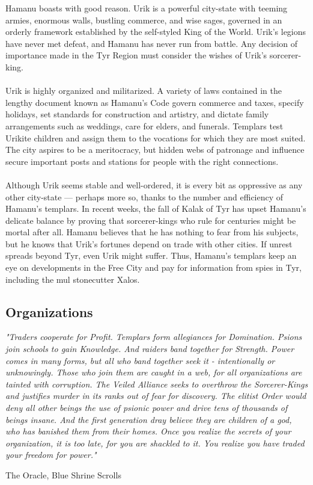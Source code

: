 \begin{multicols}{2}
Hamanu boasts with good reason. Urik is a powerful
city-state with teeming armies, enormous walls,
bustling commerce, and wise sages, governed in an
orderly framework established by the self-styled King
of the World. Urik's legions have never met defeat,
and Hamanu has never run from battle. Any decision
of importance made in the Tyr Region must consider
the wishes of Urik’s sorcerer-king.\\
\\
Urik is highly organized and militarized. A variety
of laws contained in the lengthy document known as
Hamanu's Code govern commerce and taxes, specify
holidays, set standards for construction and artistry,
and dictate family arrangements such as weddings,
care for elders, and funerals. Templars test Urikite
children and assign them to the vocations for which
they are most suited. The city aspires to be a meritocracy,
but hidden webs of patronage and influence
secure important posts and stations for people with
the right connections.\\
\\
Although Urik seems stable and well-ordered, it
is every bit as oppressive as any other city-state — perhaps
more so, thanks to the number and efficiency
of Hamanu's templars. In recent weeks, the fall of
Kalak of Tyr has upset Hamanu's delicate balance by
proving that sorcerer-kings who rule for centuries
might be mortal after all. Hamanu believes that he
has nothing to fear from his subjects, but he knows
that Urik's fortunes depend on trade with other cities.
If unrest spreads beyond Tyr, even Urik might suffer.
Thus, Hamanu’s templars keep an eye on developments
in the Free City and pay for information from
spies in Tyr, including the mul stonecutter Xalos.\\

\end{multicols}

\hrulefill

\subsection{Organizations}

\epigraph{\textit{
"Traders cooperate for Profit. Templars form allegiances for Domination. Psions join schools to gain Knowledge. And
raiders band together for Strength. Power comes in many forms, but all who band together seek it - intentionally or
unknowingly. Those who join them are caught in a web, for all organizations are tainted with corruption. The Veiled
Alliance seeks to overthrow the Sorcerer-Kings and justifies murder in its ranks out of fear for discovery. The elitist Order
would deny all other beings the use of psionic power and drive tens of thousands of beings insane. And the first generation
dray believe they are children of a god, who has banished them from their homes. Once you realize the secrets of your
organization, it is too late, for you are shackled to it. You realize you have traded your freedom for power." } }
{ The Oracle, Blue Shrine Scrolls }

